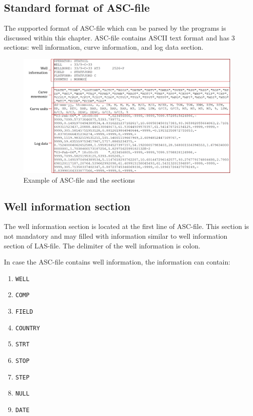 \documentclass[12pt,a4paper,oneside]{report}
\begin{document}
\begin{appendices}
\chapter{Standard format of ASC-file}
\label{ch:asc_std}
The supported format of ASC-file which can be parsed by the programs is discussed within this chapter. ASC-file contains ASCII text format and has 3 sections: well information, curve information, and log data section.

\begin{figure}[ht]
\centering
\includegraphics[width=\textwidth]{fig/asc_example.png}
\caption{Example of ASC-file and the sections}
\end{figure}

\section{Well information section}
The well information section is located at the first line of ASC-file. This section is not mandatory and may filled with information similar to well information section of LAS-file. The delimiter of the well information is colon.

In case the ASC-file contains well information, the information can contain:
\begin{enumerate}
\TabPositions{2cm}
\setlength\itemsep{0.1em}
\item \texttt{WELL} 
\item \texttt{COMP} 
\item \texttt{FIELD} 
\item \texttt{COUNTRY} 
\item \texttt{STRT} 
\item \texttt{STOP} 
\item \texttt{STEP} 
\item \texttt{NULL} 
\item \texttt{DATE} 
\end{enumerate}


\end{appendices}
\end{document}
